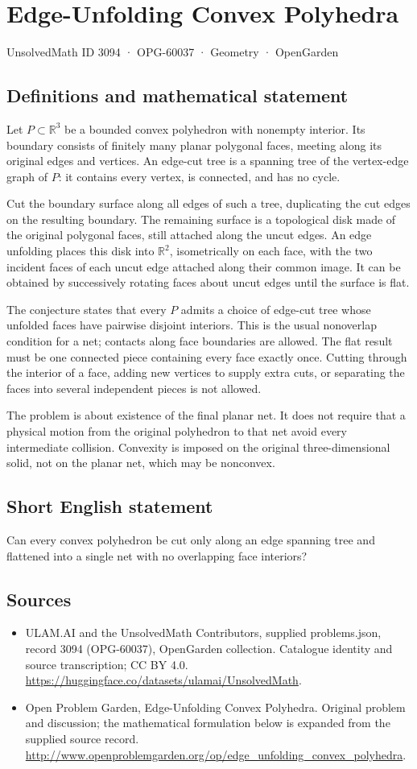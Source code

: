 \documentclass[11pt,a4paper]{article}
\begin{document}
\section*{Edge-Unfolding Convex Polyhedra}\label{3094}
{\small UnsolvedMath ID 3094 · OPG-60037 · Geometry · OpenGarden}
\subsection{Definitions and mathematical statement}
Let $P\subset\mathbb R^3$ be a bounded convex polyhedron with nonempty
interior. Its boundary consists of finitely many planar polygonal faces,
meeting along its original edges and vertices. An edge-cut tree is a
spanning tree of the vertex-edge graph of $P$: it contains every vertex,
is connected, and has no cycle.

Cut the boundary surface along all edges of such a tree, duplicating the
cut edges on the resulting boundary. The remaining surface is a topological
disk made of the original polygonal faces, still attached along the uncut
edges. An edge unfolding places this disk into $\mathbb R^2$, isometrically
on each face, with the two incident faces of each uncut edge attached
along their common image. It can be obtained by successively rotating
faces about uncut edges until the surface is flat.

The conjecture states that every $P$ admits a choice of edge-cut tree
whose unfolded faces have pairwise disjoint interiors. This is the usual
nonoverlap condition for a net; contacts along face boundaries are allowed.
The flat result must be one connected piece containing every face exactly
once. Cutting through the interior of a face, adding new vertices to
supply extra cuts, or separating the faces into several independent pieces
is not allowed.

The problem is about existence of the final planar net. It does not
require that a physical motion from the original polyhedron to that net
avoid every intermediate collision. Convexity is imposed on the original
three-dimensional solid, not on the planar net, which may be nonconvex.
\subsection{Short English statement}
Can every convex polyhedron be cut only along an edge spanning tree and flattened into a single net with no overlapping face interiors?
\subsection{Sources}
\begin{itemize}
\item[S1] ULAM.AI and the UnsolvedMath Contributors, supplied problems.json, record 3094 (OPG-60037), OpenGarden collection. Catalogue identity and source transcription; CC BY 4.0.
\url{https://huggingface.co/datasets/ulamai/UnsolvedMath}.
\item[S2] Open Problem Garden, Edge-Unfolding Convex Polyhedra. Original problem and discussion; the mathematical formulation below is expanded from the supplied source record.
\url{http://www.openproblemgarden.org/op/edge_unfolding_convex_polyhedra}.
\end{itemize}
\end{document}
